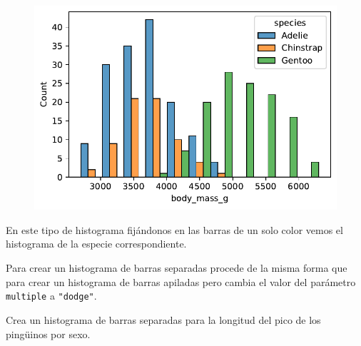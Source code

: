 \documentclass[
  a4paper,
  noprof,
  12pt,
  notoc,
  nosols,
  nobib]{mnye}
\renewenvironment{exercise}[1][]{
            \if\relax\detokenize{#1}\relax
                \ex
            \else
                \ex[note={#1}]
            \fi
        }{\endex}
\theoremstyle{definition}
\newtheorem{exercise}{Ejercicio}[section]
\theoremstyle{remark}
\begin{document}
\begin{figure}[tbph]

{\centering \includegraphics{chapters/numerical_by_categorical_files/figure-pdf/cell-5-output-1.pdf}

}

\end{figure}

En este tipo de histograma fijándonos en las barras de un solo color
vemos el histograma de la especie correspondiente.

\begin{tcolorbox}[enhanced jigsaw, arc=.35mm, colback=white, colframe=quarto-callout-note-color-frame, breakable, opacityback=0, bottomrule=.15mm, rightrule=.15mm, left=2mm, toprule=.15mm, leftrule=.75mm]
\begin{minipage}[t]{5.5mm}
\textcolor{quarto-callout-note-color}{\faInfo}
\end{minipage}%
\begin{minipage}[t]{\textwidth - 5.5mm}

Para crear un histograma de barras separadas procede de la misma forma
que para crear un histograma de barras apiladas pero cambia el valor del
parámetro \texttt{multiple} a \texttt{"dodge"}.

\end{minipage}%
\end{tcolorbox}

\begin{exercise}[]%
\protect\hypertarget{exr-histogram-stack}{}\label{exr-histogram-stack}%
Crea un histograma de barras separadas para la longitud del pico de los
pingüinos por sexo.

\end{exercise}
\end{document}
